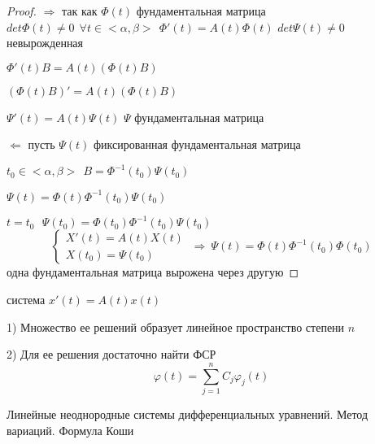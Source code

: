 \begin{proof}
  $\Rightarrow$ так как $\Phi(t)$ фундаментальная матрица $det\Phi(t) \not= 0 ~~
  \forall t \in <\alpha, \beta> ~~ \Phi'(t) = A(t)\Phi(t)$
  $det\Psi(t) \not= 0$ невырожденная

  $\Phi'(t)B = A(t)(\Phi(t)B)$

  $(\Phi(t)B)' = A(t)(\Phi(t)B)$

  $\Psi'(t) = A(t)\Psi(t)$ $\Psi$ фундаментальная матрица

  $\Leftarrow$ пусть $\Psi(t)$ фиксированная фундаментальная матрица

  $t_0 \in <\alpha, \beta> ~~ B = \Phi^{-1}(t_0) \Psi(t_0)$

  $\Psi(t) = \Phi(t) \Phi^{-1}(t_0) \Psi(t_0)$

  $t = t_0 ~~~ \Psi(t_0) = \Phi(t_0) \Phi^{-1}(t_0) \Psi(t_0)$
  $$
  \left\{
  \begin{array}{l}
    X'(t) = A(t)X(t) \\
    X(t_0) = \Psi(t_0)
  \end{array}
  \right. ~ \Rightarrow ~
  \Psi(t) = \Phi(t) \Phi^{-1}(t_0)\Phi(t_0)
  $$
  одна фундаментальная матрица вырожена через другую
\end{proof}

\begin{block}[Вывод]
  система $x'(t) = A(t)x(t)$

  1) Множество ее решений образует линейное пространство степени $n$

  2) Для ее решения достаточно найти ФСР
  $$
  \varphi(t) = \sum_{j=1}^n C_j \varphi_j(t)
  $$
\end{block}

\begin{title}[\Large]
  Линейные неоднородные системы дифференциальных уравнений. Метод вариаций.
  Формула Коши
\end{title}

